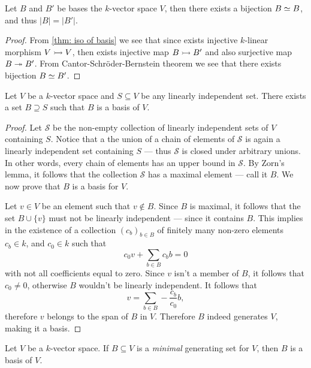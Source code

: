 \begin{lemma}
Let \(B\) and \(B'\) be bases the \(k\)-vector space \(V\), then there exists
a bijection \(B \simeq B\), and thus \(|B| = |B'|\).
\end{lemma}

\begin{proof}
From \cref{thm: iso of basis} we see that since exists injective
\(k\)-linear morphism \(V \rightarrowtail V\), then exists injective map \(B
\rightarrowtail B'\) and also surjective map \(B \twoheadrightarrow B'\). From
Cantor-Schröder-Bernstein theorem we see that there exists bijection \(B \simeq
B'\).
\end{proof}

\begin{proposition}\label{prop: li to basis}
Let \(V\) be a \(k\)-vector space and \(S \subseteq V\) be any linearly
independent set. There exists a set \(B \supseteq S\) such that \(B\) is a
basis of \(V\).
\end{proposition}

\begin{proof}
Let \(\mathcal{S}\) be the non-empty collection of linearly independent sets of
\(V\) containing \(S\). Notice that a the union of a chain of elements of
\(\mathcal{S}\) is again a linearly independent set containing \(S\) --- thus
\(\mathcal{S}\) is closed under arbitrary unions. In other words, every chain of
elements has an upper bound in \(\mathcal{S}\). By Zorn's lemma, it follows that
the collection \(\mathcal{S}\) has a maximal element --- call it \(B\). We now
prove that \(B\) is a basis for \(V\).

Let \(v \in V\) be an element such that \(v \notin B\). Since \(B\) is maximal,
it follows that the set \(B \cup \{v\}\) must not be linearly independent ---
since it contains \(B\). This implies in the existence of a collection
\((c_b)_{b \in B}\) of finitely many non-zero elements \(c_b \in k\), and \(c_0
\in k\) such that
\[
c_0 v + \sum_{b \in B} c_b b = 0
\]
with not all coefficients equal to zero. Since \(v\) isn't a member of \(B\),
it follows that \(c_0 \neq 0\), otherwise \(B\) wouldn't be linearly
independent. It follows that
\[
v = \sum_{b \in B} - \frac{c_{b}}{c_{0}} b,
\]
therefore \(v\) belongs to the span of \(B\) in \(V\). Therefore \(B\) indeed
generates \(V\), making it a basis.
\end{proof}

\begin{lemma}
\label{lem:minimal-generating-is-basis}
Let \(V\) be a \(k\)-vector space. If \(B \subseteq V\) is a \emph{minimal}
generating set for \(V\), then \(B\) is a basis of \(V\).
\end{lemma}

